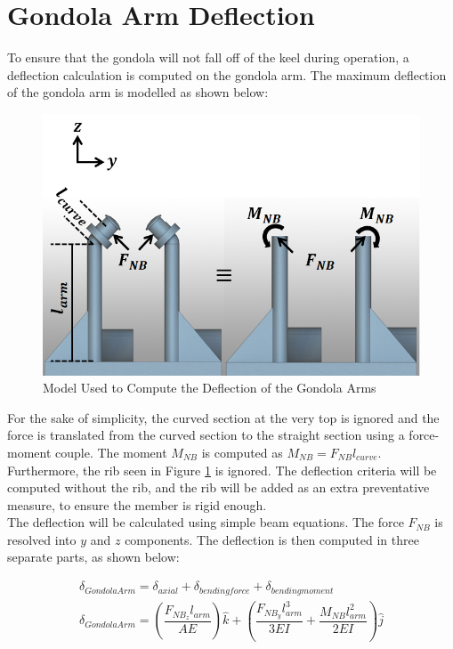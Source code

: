 \documentclass[../main.tex]{subfiles}
\begin{document}
\section{Gondola Arm Deflection}
To ensure that the gondola will not fall off of the keel during operation, a deflection calculation is computed on the gondola arm. The maximum deflection of the gondola arm is modelled as shown below:

\begin{figure}[H]
	\centering
	\includegraphics[width=.8\linewidth]{img/gondola/armDeflection.PNG}
	\caption{Model Used to Compute the Deflection of the Gondola Arms}
	\label{fig:deflection}
\end{figure}

For the sake of simplicity, the curved section at the very top is ignored and the force is translated from the curved section to the straight section using a force-moment couple. The moment $M_{NB}$ is computed as $M_{NB}=F_{NB}l_{curve}$. Furthermore, the rib seen in Figure \ref{fig:deflection} is ignored. The deflection criteria will be computed without the rib, and the rib will be added as an extra preventative measure, to ensure the member is rigid enough.\\

The deflection will be calculated using simple beam equations. The force $F_{NB}$ is resolved into $y$ and $z$ components. The deflection is then computed in three separate parts, as shown below:

\begin{align}
	\delta _{Gondola Arm} = \delta _{axial} + \delta _{bending force} + \delta _{bending moment} \\ \label{armDeflection}
	\delta _{Gondola Arm}  = \left(\dfrac{F_{NB_{z}}l_{arm}}{AE}\right)\hat{k} + \left(\dfrac{F_{NB_{y}}l_{arm}^3}{3EI}  + \dfrac{M_{NB}l_{arm}^2}{2EI} \right) \hat{j}
\end{align}
\end{document}
